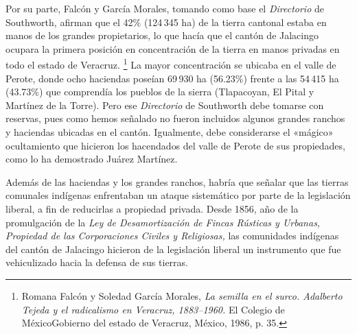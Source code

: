 \documentclass[14pt,twoside,final]{extbook} %
\let\oldfootnote\footnote
\renewcommand\footnote[1]{%
\oldfootnote{\hspace{1mm}#1}}
\begin{document}
Por su parte, Falcón y García Morales, tomando como base el \emph{Directorio} de Southworth, afirman que el 42\% (124\,345 ha) de la tierra cantonal estaba en manos de los grandes propietarios, lo que hacía que el cantón de Jalacingo ocupara la primera posición en concentración de la tierra en manos privadas en todo el estado de Veracruz.\footnote{Romana Falcón y Soledad García Morales, \emph{La semilla en el surco. Adalberto Tejeda y el radicalismo en Veracruz, 1883--1960.} El Colegio de México\kernedslash Gobierno del estado de Veracruz, México, 1986, p. 35.} La mayor concentración se ubicaba en el valle de Perote, donde ocho haciendas poseían 69\,930 ha (56.23\%) frente a las 54\,415 ha (43.73\%) que comprendía los pueblos de la sierra (Tlapacoyan, El Pital y Martínez de la Torre). Pero ese \emph{Directorio} de Southworth debe tomarse con reservas, pues como hemos señalado no fueron incluidos algunos grandes ranchos y haciendas ubicadas en el cantón. Igualmente, debe considerarse el «mágico» ocultamiento que hicieron los hacendados del valle de Perote de sus propiedades, como lo ha demostrado Juárez Martínez.

Además de las haciendas y los grandes ranchos, habría que señalar que las tierras comunales indígenas enfrentaban un ataque sistemático por parte de la legislación liberal, a fin de reducirlas a propiedad privada. Desde 1856, año de la promulgación de la \emph{Ley de Desamortización de Fincas Rústicas y Urbanas, Propiedad de las Corporaciones Civiles y Religiosas,} las comunidades indígenas del cantón de Jalacingo hicieron de la legislación liberal un instrumento que fue vehiculizado hacia la defensa de sus tierras.
\end{document}
